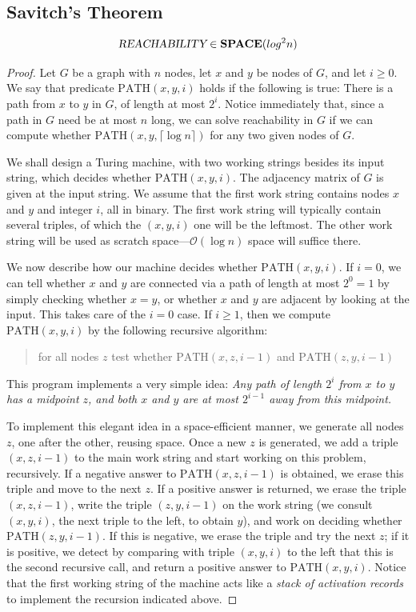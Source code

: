 \documentclass[12pt]{article}
\begin{document}
\subsection{Savitch's Theorem}
\begin{defbox}
  $$\textsl{REACHABILITY}\in\textbf{SPACE}(log^2n)$$
\end{defbox}
\begin{proof}
  Let $G$ be a graph with $n$ nodes, let $x$ and $y$ be nodes of $G$, and let $i \geq 0$. We say that predicate $\mathrm{PATH}(x, y, i)$ holds if the following is true: There is a path from $x$ to $y$ in $G$, of length at most $2^i$. Notice immediately that, since a path in $G$ need be at most $n$ long, we can solve reachability in $G$ if we can compute whether $\mathrm{PATH}(x, y, \lceil \log n \rceil)$ for any two given nodes of $G$.

We shall design a Turing machine, with two working strings besides its input string, which decides whether $\mathrm{PATH}(x, y, i)$. The adjacency matrix of $G$ is given at the input string. We assume that the first work string contains nodes $x$ and $y$ and integer $i$, all in binary. The first work string will typically contain several triples, of which the $(x, y, i)$ one will be the leftmost. The other work string will be used as scratch space---$\mathcal{O}(\log n)$ space will suffice there.

We now describe how our machine decides whether $\mathrm{PATH}(x, y, i)$. If $i = 0$, we can tell whether $x$ and $y$ are connected via a path of length at most $2^0 = 1$ by simply checking whether $x = y$, or whether $x$ and $y$ are adjacent by looking at the input. This takes care of the $i = 0$ case. If $i \geq 1$, then we compute $\mathrm{PATH}(x, y, i)$ by the following recursive algorithm:
\begin{quote}
    for all nodes $z$ test whether $\mathrm{PATH}(x, z, i-1)$ and $\mathrm{PATH}(z, y, i-1)$
\end{quote}
This program implements a very simple idea: \textit{Any path of length $2^i$ from $x$ to $y$ has a midpoint $z$, and both $x$ and $y$ are at most $2^{i-1}$ away from this midpoint.}

To implement this elegant idea in a space-efficient manner, we generate all nodes $z$, one after the other, reusing space. Once a new $z$ is generated, we add a triple $(x, z, i-1)$ to the main work string and start working on this problem, recursively. If a negative answer to $\mathrm{PATH}(x, z, i-1)$ is obtained, we erase this triple and move to the next $z$. If a positive answer is returned, we erase the triple $(x, z, i-1)$, write the triple $(z, y, i-1)$ on the work string (we consult $(x, y, i)$, the next triple to the left, to obtain $y$), and work on deciding whether $\mathrm{PATH}(z, y, i-1)$. If this is negative, we erase the triple and try the next $z$; if it is positive, we detect by comparing with triple $(x, y, i)$ to the left that this is the second recursive call, and return a positive answer to $\mathrm{PATH}(x, y, i)$. Notice that the first working string of the machine acts like a \textit{stack of activation records} to implement the recursion indicated above.


\end{proof}
\end{document}
